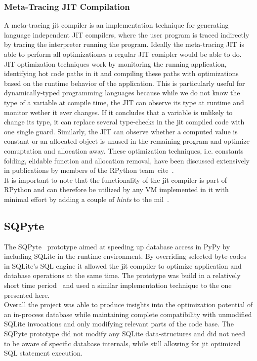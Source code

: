 \documentclass[preprint, nonatbib]{sigplanconf}
\begin{document}
\subsubsection{Meta-Tracing JIT Compilation}
A meta-tracing \gls{jit} compiler is an implementation technique for generating language independent JIT compilers, where the user program is traced indirectly by tracing the interpreter running the program. Ideally the meta-tracing JIT is able to perform all optimizationes a regular JIT comipler would be able to do. \\
JIT optimization techniques work by monitoring the running application, identifying hot code paths in it and compiling these paths with optimizations based on the runtime behavior of the application. This is particularly useful for dynamically-typed programming languages because while we do not know the type of a variable at compile time, the JIT can observe its type at runtime and monitor wether it ever changes. If it concludes that a variable is unlikely to change its type, it can replace several type-checks in the \gls{jit} compiled code with one single guard. Similarly, the JIT can observe whether a computed value is constant or an allocated object is unused in the remaining program and optimize comuptation and allocation away. These optimization techniques, i.e. constants folding, elidable function and allocation removal, have been discussed extensively in publications by members of the RPython team~cite~\cite{bolz2011allocationremoval}.\\
It is important to note that the functionality of the \gls{jit} compiler is part of RPython and can therefore be utilized by any VM implemented in it with minimal effort by adding a couple of \emph{hints} to the \gls{mil}~\cite{bolz2009tracing}. 

\subsection{SQPyte}
\label{sec:SQPyte}
The SQPyte~\cite{bolz2016making} prototype aimed at speeding up database access in PyPy by including SQLite in the runtime environment. By overriding selected byte-codes in SQLite's SQL engine it allowed the \gls{jit} compiler to optimize application and database operations at the same time. The prototype was build in a relatively short time period~\cite{bolz2016personal} and used a similar implementation technique to the one presented here.\\
Overall the project was able to produce insights into the optimization potential of an in-process database while maintaining complete compatibility with unmodified SQLite invocations and only modifying relevant parts of the code base. The SQPyte prototype did not modify any SQLite data-structures and did not need to be aware of specific database internals, while still allowing for \gls{jit} optimized SQL statement execution.\\
\end{document}
